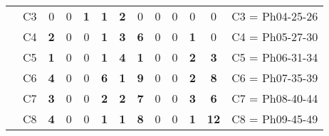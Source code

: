 \begin{table}[H]
{\begin{tabular}{|ccrrrrrrrrrrc|}
\multicolumn{1}{|c|}{}                                      & \multicolumn{1}{c|}{C3} & \multicolumn{1}{c|}{0}  & \multicolumn{1}{c|}{0}  & \multicolumn{1}{c|}{\textbf{1}}  & \multicolumn{1}{c|}{\textbf{1}}  & \multicolumn{1}{c|}{\textbf{2}}  & \multicolumn{1}{c|}{0}  & \multicolumn{1}{c|}{0}  & \multicolumn{1}{c|}{0}  & \multicolumn{1}{c|}{0}  & \multicolumn{1}{c|}{0}  & C3 = Ph04-25-26   \\ \cline{2-13}
\multicolumn{1}{|c|}{}                                      & \multicolumn{1}{c|}{C4} & \multicolumn{1}{c|}{\textbf{2}}  & \multicolumn{1}{c|}{0}  & \multicolumn{1}{c|}{0}  & \multicolumn{1}{c|}{\textbf{1}}  & \multicolumn{1}{c|}{\textbf{3}}  & \multicolumn{1}{c|}{\textbf{6}}  & \multicolumn{1}{c|}{0}  & \multicolumn{1}{c|}{0}  & \multicolumn{1}{c|}{\textbf{1}}  & \multicolumn{1}{c|}{0}  & C4 = Ph05-27-30   \\ \cline{2-13}
\multicolumn{1}{|c|}{}                                      & \multicolumn{1}{c|}{C5} & \multicolumn{1}{c|}{\textbf{1}}  & \multicolumn{1}{c|}{0}  & \multicolumn{1}{c|}{0}  & \multicolumn{1}{c|}{\textbf{1}}  & \multicolumn{1}{c|}{\textbf{4}}  & \multicolumn{1}{c|}{\textbf{1}}  & \multicolumn{1}{c|}{0}  & \multicolumn{1}{c|}{0}  & \multicolumn{1}{c|}{\textbf{2}}  & \multicolumn{1}{c|}{\textbf{3}}  & C5 = Ph06-31-34   \\ \cline{2-13}
\multicolumn{1}{|c|}{}                                      & \multicolumn{1}{c|}{C6} & \multicolumn{1}{c|}{\textbf{4}}  & \multicolumn{1}{c|}{0}  & \multicolumn{1}{c|}{0}  & \multicolumn{1}{c|}{\textbf{6}}  & \multicolumn{1}{c|}{\textbf{1}}  & \multicolumn{1}{c|}{\textbf{9}}  & \multicolumn{1}{c|}{0}  & \multicolumn{1}{c|}{0}  & \multicolumn{1}{c|}{\textbf{2}}  & \multicolumn{1}{c|}{\textbf{8}}  & C6 = Ph07-35-39   \\ \cline{2-13}
\multicolumn{1}{|c|}{}                                      & \multicolumn{1}{c|}{C7} & \multicolumn{1}{c|}{\textbf{3}}  & \multicolumn{1}{c|}{0}  & \multicolumn{1}{c|}{0}  & \multicolumn{1}{c|}{\textbf{2}}  & \multicolumn{1}{c|}{\textbf{2}}  & \multicolumn{1}{c|}{\textbf{7}}  & \multicolumn{1}{c|}{0}  & \multicolumn{1}{c|}{0}  & \multicolumn{1}{c|}{\textbf{3}}  & \multicolumn{1}{c|}{\textbf{6}}  & C7 = Ph08-40-44   \\ \cline{2-13}
\multicolumn{1}{|c|}{}                                      & \multicolumn{1}{c|}{C8} & \multicolumn{1}{c|}{\textbf{4}}  & \multicolumn{1}{c|}{0}  & \multicolumn{1}{c|}{0}  & \multicolumn{1}{c|}{\textbf{1}}  & \multicolumn{1}{c|}{\textbf{1}}  & \multicolumn{1}{c|}{\textbf{8}}  & \multicolumn{1}{c|}{0}  & \multicolumn{1}{c|}{0}  & \multicolumn{1}{c|}{\textbf{1}}  & \multicolumn{1}{c|}{\textbf{12}} & C8 = Ph09-45-49   \\ \cline{2-13}

\end{tabular}}
\end{table}
